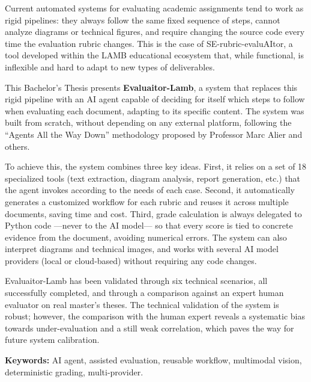 \documentclass[12pt,a4paper,twoside]{report}
\begin{document}
Current automated systems for evaluating academic assignments tend to work as rigid pipelines: they always follow the same fixed sequence of steps, cannot analyze diagrams or technical figures, and require changing the source code every time the evaluation rubric changes. This is the case of SE-rubric-evaluAItor, a tool developed within the LAMB educational ecosystem that, while functional, is inflexible and hard to adapt to new types of deliverables.

This Bachelor's Thesis presents \textbf{Evaluaitor-Lamb}, a system that replaces this rigid pipeline with an AI agent capable of deciding for itself which steps to follow when evaluating each document, adapting to its specific content. The system was built from scratch, without depending on any external platform, following the ``Agents All the Way Down'' methodology \cite{alier2025} proposed by Professor Marc Alier and others.

To achieve this, the system combines three key ideas. First, it relies on a set of 18 specialized tools (text extraction, diagram analysis, report generation, etc.) that the agent invokes according to the needs of each case. Second, it automatically generates a customized workflow for each rubric and reuses it across multiple documents, saving time and cost. Third, grade calculation is always delegated to Python code ---never to the AI model--- so that every score is tied to concrete evidence from the document, avoiding numerical errors. The system can also interpret diagrams and technical images, and works with several AI model providers (local or cloud-based) without requiring any code changes.

Evaluaitor-Lamb has been validated through six technical scenarios, all successfully completed, and through a comparison against an expert human evaluator on real master's theses. The technical validation of the system is robust; however, the comparison with the human expert reveals a systematic bias towards under-evaluation and a still weak correlation, which paves the way for future system calibration.

\textbf{Keywords:} AI agent, assisted evaluation, reusable workflow, multimodal vision, deterministic grading, multi-provider.

\tableofcontents
\newpage

\listoffigures
{}
\newpage
\end{document}

